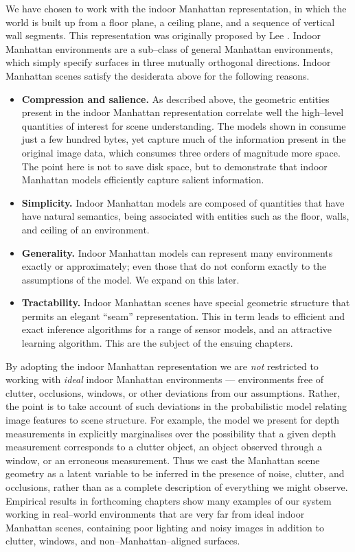 We have chosen to work with the indoor Manhattan representation, in
which the world is built up from a floor plane, a ceiling plane, and a
sequence of vertical wall segments. This representation was originally
proposed by Lee \etal \cite{Lee09}. Indoor Manhattan environments are
a sub--class of general Manhattan environments, which simply specify
surfaces in three mutually orthogonal directions. Indoor Manhattan
scenes satisfy the desiderata above for the following reasons.
\begin{itemize}
  \item{\textbf{Compression and salience.} As described above, the
    geometric entities present in the indoor Manhattan representation
    correlate well the high--level quantities of interest for scene
    understanding. The models shown in  consume
    just a few hundred bytes, yet capture much of the information
    present in the original image data, which consumes three orders of
    magnitude more space. The point here is not to save disk space,
    but to demonstrate that indoor Manhattan models efficiently capture
    salient information.}
  \item{\textbf{Simplicity.} Indoor Manhattan models are composed of
    quantities that have 
    have natural semantics, being associated with entities such as the
    floor, walls, and ceiling of an environment.}
  \item{\textbf{Generality.} Indoor Manhattan models can represent
    many environments exactly or approximately; even those that do not
    conform exactly to the assumptions of the model. We expand on this later.}
  \item{\textbf{Tractability.} Indoor Manhattan scenes have special
    geometric structure that permits an elegant ``seam''
    representation. This in term leads to efficient and exact
    inference algorithms for a range of sensor models, and an
    attractive learning algorithm. This are the subject of the ensuing
    chapters.}
\end{itemize}

By adopting the indoor Manhattan representation we are \textit{not}
restricted to working with \textit{ideal} indoor Manhattan
environments --- environments free of clutter, occlusions, windows,
or other deviations from our assumptions. Rather, the point is to take
account of such deviations in the probabilistic model relating image
features to scene structure. For example, the model we present for
depth measurements in  explicitly marginalises over
the possibility that a given depth measurement corresponds to a
clutter object, an object observed through a window, or an erroneous
measurement. Thus we cast the Manhattan scene geometry as a latent
variable to be inferred in the presence of noise, clutter, and
occlusions, rather than as a complete description of everything we
might observe. Empirical results in forthcoming chapters show many
examples of our system working in real--world environments that are
very far from ideal indoor Manhattan scenes, containing poor lighting
and noisy images in addition to clutter, windows, and
non--Manhattan--aligned surfaces.

